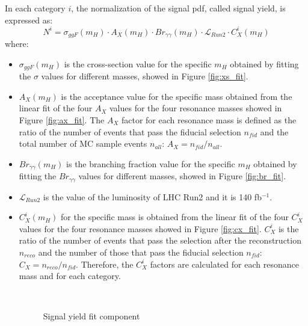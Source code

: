 \documentclass[a4paper, oneside, 11pt, openright]{book}
\begin{document}
 				In each category $i$, the normalization of the signal pdf, called signal yield, is expressed as:
 				\begin{equation}\label{eq:signal_yield}
 					N^i = \sigma_{ggF}(m_H) \cdot A_X(m_H) \cdot Br_{\gamma\gamma}(m_H) \cdot \mathcal{L}_{Run2} \cdot C_X^i(m_H)
 				\end{equation}
 				where:
 				\begin{itemize}
 					\item $\sigma_{ggF}(m_H)$ is the cross-section value for the specific $m_H$ obtained by fitting the $\sigma$ values for different masses, showed in Figure \ref{fig:xs_fit}.
 					\item $A_X(m_H)$ is the acceptance value for the specific mass obtained from the linear fit of the four $A_X$ values for the four resonance masses showed in Figure \ref{fig:ax_fit}. The $A_X$ factor for each resonance mass is defined as the ratio of the number of events that pass the fiducial selection $n_{fid}$ and the total number of MC sample events $n_{all}$: $A_X = n_{fid}/n_{all}$.
 					\item $Br_{\gamma\gamma}(m_H)$ is the branching fraction value for the specific $m_H$ obtained by fitting the $Br_{\gamma\gamma}$ values for different masses, showed in Figure \ref{fig:br_fit}.  
 					\item $\mathcal{L}_{Run2}$ is the value of the luminosity of LHC Run2 and it is 140 fb$^{-1}$.
 					\item $C_X^i(m_H)$ for the specific mass is obtained from the linear fit of the four $C_X^i$ values for the four resonance masses showed in Figure \ref{fig:cx_fit}. $C_X^i$ is the ratio of the number of events that pass the selection after the reconstruction $n_{reco}$ and the number of those that pass the fiducial selection $n_{fid}$: $C_X = n_{reco}/n_{fid}$. Therefore, the $C_X^i$ factors are calculated for each resonance mass and for each category.
 				
 					\begin{figure}[h!]
 						\centering
 						\\
 						\caption{Signal yield fit component}
 						\label{fig:signal_yiels}
 					\end{figure}
 				\end{itemize}
 				
\end{document}
